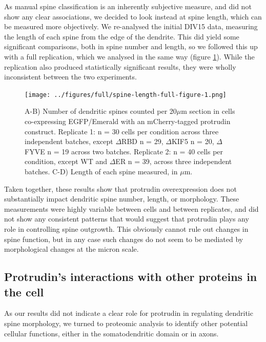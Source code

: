 \documentclass[
  12pt,
  a4paper,
]{book}
\begin{document}

As manual spine classification is an inherently subjective measure, and did not show any clear associations, we decided to look instead at spine length, which can be measured more objectively. We re-analysed the initial DIV15 data, measuring the length of each spine from the edge of the dendrite. This did yield some significant comparisons, both in spine number and length, so we followed this up with a full replication, which we analysed in the same way (figure \ref{fig:spine-length-full-figure}). While the replication also produced statistically significant results, they were wholly inconsistent between the two experiments.

\begin{figure}
\centering
\texttt{[image: ../figures/full/spine-length-full-figure-1.png]}
\caption{\label{fig:spine-length-full-figure}A-B) Number of dendritic spines counted per 20\(\mu\)m section in cells co-expressing EGFP/Emerald with an mCherry-tagged protrudin construct. Replicate 1: n = 30 cells per condition across three independent batches, except \(\Delta\)RBD n = 29, \(\Delta\)KIF5 n = 20, \(\Delta\)FYVE n = 19 across two batches. Replicate 2: n = 40 cells per condition, except WT and \(\Delta\)ER n = 39, across three independent batches. C-D) Length of each spine measured, in \(\mu\)m.}
\end{figure}

Taken together, these results show that protrudin overexpression does not substantially impact dendritic spine number, length, or morphology. These measurements were highly variable between cells and between replicates, and did not show any consistent patterns that would suggest that protrudin plays any role in controlling spine outgrowth. This obviously cannot rule out changes in spine function, but in any case such changes do not seem to be mediated by morphological changes at the micron scale.

\hypertarget{GO-analysis}{%
\subsection{Protrudin's interactions with other proteins in the cell}\label{GO-analysis}}

As our results did not indicate a clear role for protrudin in regulating dendritic spine morphology, we turned to proteomic analysis to identify other potential cellular functions, either in the somatodendritic domain or in axons.
\end{document}
